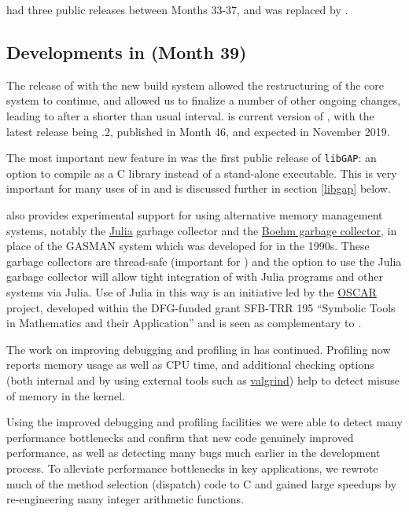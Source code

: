  had three public releases between Months 33-37, and
was replaced by .

\subsection{Developments in  (Month 39)}\label{gap-4.10}

The release of  with the new build system allowed the
restructuring of the core \GAP system to continue, and allowed us to
finalize a number of other ongoing changes, leading to 
after a shorter than usual interval.  is current
version of \GAP, with the latest release being .2, published
in Month 46, and  expected in November 2019.

The most important new feature in  was the first public
release of \texttt{libGAP}: an
option to compile \GAP as a C library instead of a stand-alone
executable. This is very important for many uses of \GAP in \ODK and
is discussed further in section \ref{libgap} below.

 also provides experimental support for using alternative
memory management systems, notably the \href{??}{Julia} garbage
collector and the \href{???}{Boehm garbage collector}, in place of the
GASMAN system which was developed for  in the 1990s.  These
garbage collectors are thread-safe (important for \HPCGAP) and the
option to use the Julia garbage collector will allow tight integration
of \GAP with Julia programs and other systems via Julia. Use of Julia
in this way is an initiative led by the
\href{https://oscar.computeralgebra.de/}{OSCAR} project, developed
within the DFG-funded grant SFB-TRR 195 ``Symbolic Tools in
Mathematics and their Application'' and is seen as complementary to \ODK.

The work on improving debugging and profiling in \GAP has
continued. Profiling now reports memory usage as well as CPU time, and
additional checking options (both internal and by using external tools such as
\href{???}{valgrind}) help to detect misuse of memory in the kernel.

Using the improved debugging and profiling facilities we were able to
detect many performance bottlenecks and confirm that new code
genuinely improved performance, as well as detecting many bugs much
earlier in the development process. To alleviate performance
bottlenecks in key applications, we rewrote much of the method
selection (dispatch) code \GAP to C and gained large speedups by
re-engineering many integer arithmetic functions.

